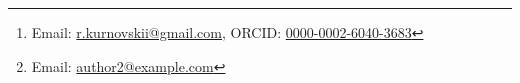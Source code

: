 \author[1]{Roman Kurnovskii\thanks{Email: \href{mailto:r.kurnovskii@gmail.com}{r.kurnovskii@gmail.com}, ORCID: \href{https://orcid.org/0000-0002-6040-3683}{0000-0002-6040-3683}}}

\author[2]{Author Two\thanks{Email: \href{mailto:author2@example.com}{author2@example.com}}}
